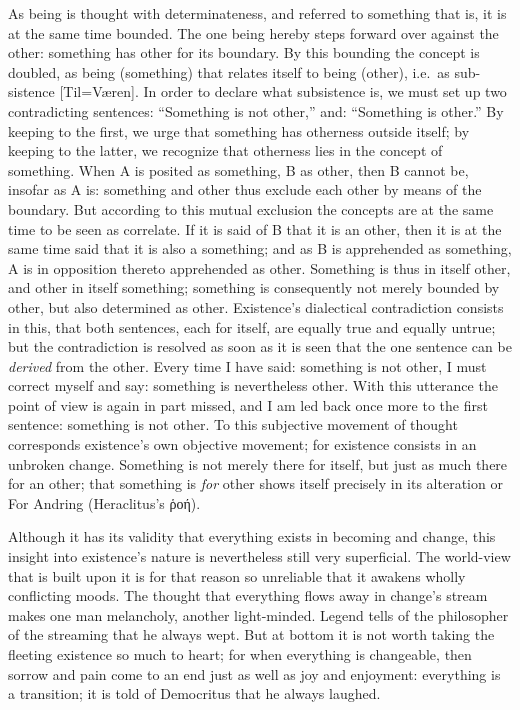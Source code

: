 \documentclass[12pt]{book}
\begin{document}
As being is thought with determinateness, and referred to something that is,
it is at the same time bounded. The one being hereby steps forward over
against the other: something has other for its boundary. By this bounding
the concept is doubled, as being (something) that relates itself to being
(other), i.e.\ as sub-sistence [Til=Væren]. In order to declare what
subsistence is, we must set up two contradicting sentences: ``Something is
not other,'' and: ``Something is other.'' By keeping to the first, we urge
that something has otherness outside itself; by keeping to the latter, we
recognize that otherness lies in the concept of something. When A is posited
as something, B as other, then B cannot be, insofar as A is: something and
other thus exclude each other by means of the boundary. But according to
this mutual exclusion the concepts are at the same time to be seen as
correlate. If it is said of B that it is an other, then it is at the same
time said that it is also a something; and as B is apprehended as something,
A is in opposition thereto apprehended as other. Something is thus in itself
other, and other in itself something; something is consequently not merely
bounded by other, but also determined as other. Existence's dialectical
contradiction consists in this, that both sentences, each for itself, are
equally true and equally untrue; but the contradiction is resolved as soon
as it is seen that the one sentence can be \emph{derived} from the other.
Every time I have said: something is not other, I must correct myself and
say: something is nevertheless other. With this utterance the point of view
is again in part missed, and I am led back once more to the first sentence:
something is not other. To this subjective movement of thought corresponds
existence's own objective movement; for existence consists in an unbroken
change. Something is not merely there for itself, but just as much there for
an other; that something is \emph{for} other shows itself precisely in its
alteration or For Andring (Heraclitus's ῥοή).

Although it has its validity that everything exists in becoming and change,
this insight into existence's nature is nevertheless still very superficial.
The world-view that is built upon it is for that reason so unreliable that
it awakens wholly conflicting moods. The thought that everything flows away
in change's stream makes one man melancholy, another light-minded. Legend
tells of the philosopher of the streaming that he always wept. But at bottom
it is not worth taking the fleeting existence so much to heart; for when
everything is changeable, then sorrow and pain come to an end just as well
as joy and enjoyment: everything is a transition; it is told of Democritus
that he always laughed.
\end{document}
